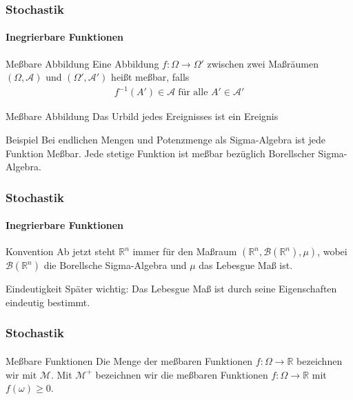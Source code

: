 \documentclass{beamer}
\begin{document}
 \begin{frame}
    \frametitle{Stochastik}
\framesubtitle{Inegrierbare Funktionen}
    \begin{block}{Meßbare Abbildung}
     Eine Abbildung $f:\Omega \to \Omega'$ zwischen zwei Maßräumen 
      $(\Omega, \mathcal{A})$ und $(\Omega', \mathcal{A}')$ heißt meßbar, falls
    \begin{align*}
        f^{-1}(A') \in \mathcal{A} \; \text{für alle } A' \in \mathcal{A}'
    \end{align*}
    \end{block}

    \begin{block}{Meßbare Abbildung}
    Das Urbild jedes Ereignisses ist ein Ereignis
    \end{block}

    \begin{block}{Beispiel}
        Bei endlichen Mengen und Potenzmenge als Sigma-Algebra ist jede Funktion Meßbar.
        Jede stetige Funktion ist meßbar bezüglich Borellscher Sigma-Algebra.
    \end{block}

    
 \end{frame}

 \begin{frame}
    \frametitle{Stochastik}
\framesubtitle{Inegrierbare Funktionen}
    \begin{block}{Konvention}
        Ab jetzt steht $\mathbb{R}^n$ immer für den Maßraum
        $(\mathbb{R}^n, \mathcal{B}(\mathbb{R}^n), \mu)$, wobei $\mathcal{B}(\mathbb{R}^n)$ die Borellsche Sigma-Algebra 
        und $\mu$ das Lebesgue Maß  ist.
    \end{block}

    \begin{block}{Eindeutigkeit}
        Später wichtig: Das Lebesgue Maß ist durch seine Eigenschaften eindeutig bestimmt.
    \end{block}


\end{frame}

\begin{frame}
    \frametitle{Stochastik}
\framesubtitle{}
    \begin{block}{Meßbare Funktionen }
        Die Menge der meßbaren Funktionen $f: \Omega \to \mathbb{R}$ bezeichnen wir mit $\mathcal{M}$. 
        Mit $\mathcal{M}^+$ bezeichnen wir die meßbaren Funktionen $f: \Omega \to \mathbb{R}$ mit $f(\omega) \geq 0$. 
    \end{block}

\end{frame}
\end{document}
